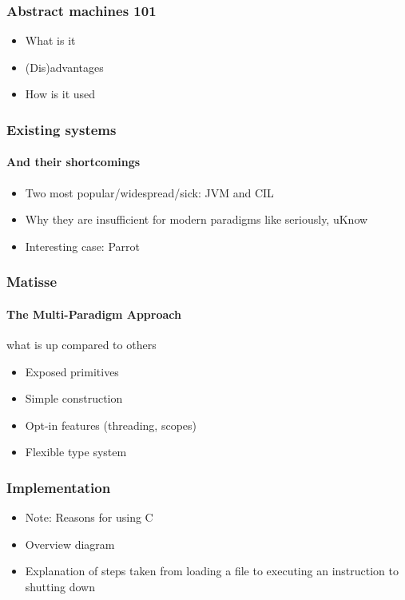 \documentclass[handout]{beamer}
\begin{document}
\begin{frame}
  \frametitle{Abstract machines 101}

  \begin{itemize}
  \item What is it
  \item (Dis)advantages
  \item How is it used
  \end{itemize}
\end{frame}

\begin{frame}
  \frametitle{Existing systems}
  \framesubtitle{And their shortcomings}

  \begin{itemize}
  \item Two most popular/widespread/sick: JVM and CIL
  \item Why they are insufficient for modern paradigms like seriously, uKnow
  \item Interesting case: Parrot
  \end{itemize}
\end{frame}

\begin{frame}
  \frametitle{Matisse}
  \framesubtitle{The Multi-Paradigm Approach}

  what is up compared to others
  \begin{itemize}
  \item Exposed primitives
  \item Simple construction
  \item Opt-in features (threading, scopes)
  \item Flexible type system
  \end{itemize}
\end{frame}

\begin{frame}
  \frametitle{Implementation}

  \begin{itemize}
  \item Note: Reasons for using C
  \item Overview diagram
  \item Explanation of steps taken from loading a file to executing an
    instruction to shutting down
  \end{itemize}
\end{frame}
\end{document}
